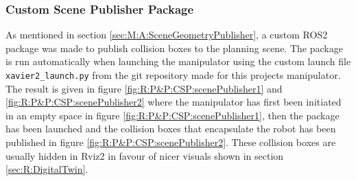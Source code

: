 
\subsubsection{Custom Scene Publisher Package}
As mentioned in section \ref{sec:M:A:SceneGeometryPublisher}, a custom ROS2 package was made to publish collision boxes to the planning scene. The package is run automatically when launching the manipulator using the custom launch file \lstinline{xavier2_launch.py} from the git repository made for this projects manipulator\cite{husky_vx300_repo}. The result is given in figure \ref{fig:R:P&P:CSP:scenePublisher1} and  \ref{fig:R:P&P:CSP:scenePublisher2} where the manipulator has first been initiated in an empty space in figure \ref{fig:R:P&P:CSP:scenePublisher1}, then the package has been launched and the collision boxes that encapsulate the robot has been published in figure \ref{fig:R:P&P:CSP:scenePublisher2}. These collision boxes are usually hidden in Rviz2 in favour of nicer visuals shown in section \ref{sec:R:DigitalTwin}.

